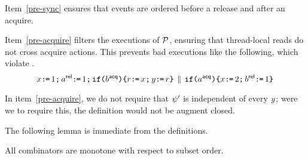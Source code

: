 


Item~\ref{pre-sync} ensures that events are ordered before a release and
after an acquire.

Item~\ref{pre-acquire} filters the executions of $\mathcal{P}$, ensuring that
thread-local reads do not cross acquire actions.  This prevents bad executions like the following, which violate \drfsc. 
\begin{displaymath}
  x\texttt{:}\mkern-1mu\texttt{=}\,1 \texttt{;}\,
  a^{\mathsf{rel}}\texttt{:}\mkern-1mu\texttt{=}\,1 \texttt{;}\,
  \texttt{if}\allowbreak\texttt{(}b^{\mathsf{acq}}\texttt{)}\allowbreak\texttt{\{}  r\texttt{:}\mkern-1mu\texttt{=}\, x\texttt{;}\, y\texttt{:}\mkern-1mu\texttt{=}\,r \texttt{\}}
  \,\mathbin{\|}\,
  \texttt{if}\allowbreak\texttt{(}a^{\mathsf{acq}}\texttt{)}\allowbreak\texttt{\{}  x\texttt{:}\mkern-1mu\texttt{=}\, 2\texttt{;}\, b^{\mathsf{rel}}\texttt{:}\mkern-1mu\texttt{=}\,1 \texttt{\}}
\end{displaymath}
\begin{tikzdisplay}[node distance=1em]
\end{tikzdisplay}
In item~\ref{pre-acquire}, we do not require that $\psi'$ is independent of
every $y$; were we to require this, the definition would not be augment closed.

The following lemma is immediate from the definitions.
\begin{lemma}
  \label{lem:monotone}
  All combinators are monotone with respect to subset order.  
\end{lemma}


